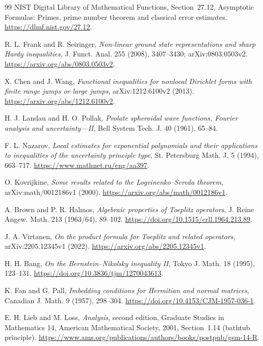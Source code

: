 \documentclass[11pt]{article}
\theoremstyle{remark}
\begin{document}
\begin{thebibliography}{99}
NIST Digital Library of Mathematical Functions, Section~27.12,
Asymptotic Formulas: Primes, prime number theorem and classical error
estimates. \url{https://dlmf.nist.gov/27.12}.

R. L. Frank and R. Seiringer,
\emph{Non-linear ground state representations and sharp Hardy inequalities},
J. Funct. Anal. 255 (2008), 3407--3430;
arXiv:0803.0503v2.
\url{https://arxiv.org/abs/0803.0503v2}.

X. Chen and J. Wang,
\emph{Functional inequalities for nonlocal Dirichlet forms with finite
range jumps or large jumps},
arXiv:1212.6100v2 (2013).
\url{https://arxiv.org/abs/1212.6100v2}.

H. J. Landau and H. O. Pollak,
\emph{Prolate spheroidal wave functions, Fourier analysis and
uncertainty---II},
Bell System Tech. J. 40 (1961), 65--84.

F. L. Nazarov,
\emph{Local estimates for exponential polynomials and their
applications to inequalities of the uncertainty principle type},
St. Petersburg Math. J. 5 (1994), 663--717.
\url{https://www.mathnet.ru/eng/aa397}.

O. Kovrijkine,
\emph{Some results related to the Logvinenko--Sereda theorem},
arXiv:math/0012186v1 (2000).
\url{https://arxiv.org/abs/math/0012186v1}.

A. Brown and P. R. Halmos,
\emph{Algebraic properties of Toeplitz operators},
J. Reine Angew. Math. 213 (1963/64), 89--102.
\url{https://doi.org/10.1515/crll.1964.213.89}.

J. A. Virtanen,
\emph{On the product formula for Toeplitz and related operators},
arXiv:2205.12345v1 (2022).
\url{https://arxiv.org/abs/2205.12345v1}.

H. H. Bang,
\emph{On the Bernstein--Nikolsky inequality II},
Tokyo J. Math. 18 (1995), 123--131.
\url{https://doi.org/10.3836/tjm/1270043613}.


K. Fan and G. Pall, \emph{Imbedding conditions for Hermitian and normal
matrices}, Canadian J. Math. 9 (1957), 298--304.
\url{https://doi.org/10.4153/CJM-1957-036-1}.

E. H. Lieb and M. Loss, \emph{Analysis}, second edition,
Graduate Studies in Mathematics 14, American Mathematical Society, 2001,
Section~1.14 (bathtub principle).
\url{https://www.ams.org/publications/authors/books/postpub/gsm-14-R}.


\end{thebibliography}
\end{document}
